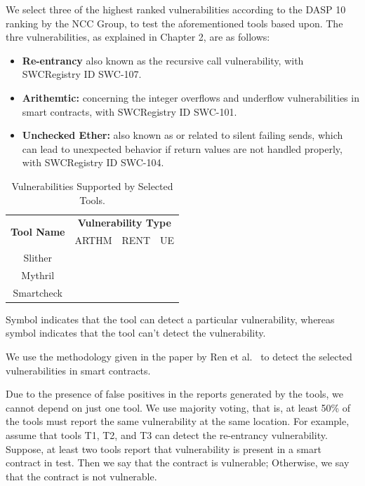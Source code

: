 	
	We select three of the highest ranked vulnerabilities according to the DASP 10 ranking by the NCC Group, to test the aforementioned tools based upon.
	The thre vulnerabilities, as explained in Chapter 2, are as follows:
	\begin{itemize}
		\item \textbf{Re-entrancy} also known as the recursive call vulnerability, with SWCRegistry ID SWC-107.
		\item \textbf{Arithemtic:} concerning the integer overflows and underflow vulnerabilities in smart contracts, with SWCRegistry ID SWC-101.
		\item \textbf{Unchecked Ether:} also known as or related to silent failing sends, which can lead to unexpected behavior if return values are not handled properly, with SWCRegistry ID SWC-104.
	\end{itemize} 
	
	\begin{table}[t]
		\caption{Vulnerabilities Supported by Selected Tools.}
		\label{tab:freq}
		\begin{tabular}{cccc}
	  
	  \multirow{2}{*}{\textbf{Tool Name}} & \multicolumn{3}{c}{\textbf{Vulnerability Type}} \\
		 & ARTHM & RENT & UE \\ \midrule
		  Slither    & \crossmark  &  \checkmark  &  \checkmark  \\
		  Mythril    & \checkmark  &  \checkmark  &  \checkmark  \\
		  Smartcheck & \checkmark  &  \crossmark  &  \checkmark  \\
		  \bottomrule
	  \end{tabular}
	  \label{table:vuln_supported_per_tool}
	  \end{table}
	
	
	Symbol \checkmark indicates that the tool can detect a particular vulnerability, whereas symbol \crossmark indicates that the tool can't detect the vulnerability.
	
	We use the methodology given in the paper by Ren et al.~\cite{Making-Smart-Contract-Development-More-Secure-and-Easier} to detect the selected vulnerabilities in smart contracts.
	
	Due to the presence of false positives in the reports generated by the tools, we cannot depend on just one tool.
	We use majority voting, that is, at least 50\% of the tools must report the same vulnerability at the same location.
	For example, assume that tools T1, T2, and T3 can detect the re-entrancy vulnerability.
	Suppose, at least two tools report that vulnerability is present in a smart contract in test.
	Then we say that the contract is vulnerable;
	Otherwise, we say that the contract is not vulnerable.
	
